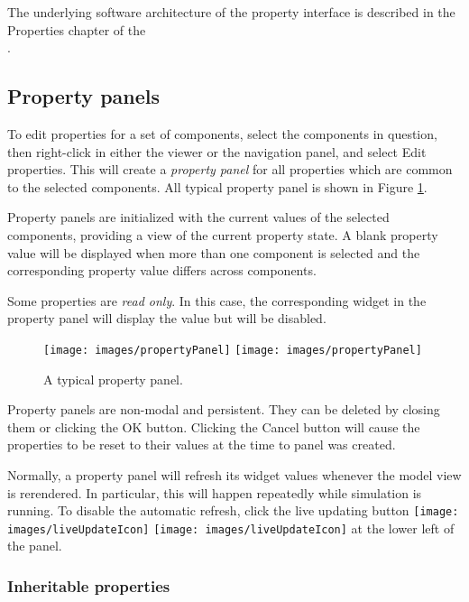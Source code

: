 \documentclass{article}
\begin{document}
The underlying software architecture of the property interface is 
described in the Properties chapter of the\\
.

\subsection{Property panels}
\label{propertyPanelsSec}

To edit properties for a set of components, select the components in
question, then right-click in either the viewer or the navigation
panel, and select {\sf Edit properties}. This will create a {\it property
panel} for all properties which are common to the selected components.
All typical property panel is shown in Figure \ref{propertyPanelFig}.

Property panels are initialized with the current values of the selected
components, providing a view of the current property state. A blank
property value will be displayed when more than one component is selected and 
the corresponding property value differs across components.

Some properties are {\it read only}. In this case, the corresponding
widget in the property panel will display the value but will be
disabled.

\begin{figure}[h]
\begin{center}
\iflatexml
\texttt{[image: images/propertyPanel]}
\else
\texttt{[image: images/propertyPanel]}
\fi
\end{center}
\caption{A typical property panel.}%
\label{propertyPanelFig}
\end{figure}

Property panels are non-modal and persistent. 
They can be deleted by
closing them or clicking the {\sf OK} button. Clicking the {\sf Cancel} button
will cause the properties to be reset to their values at the time to
panel was created.

Normally, a property panel will refresh its widget values whenever the
model view is rerendered. In particular, this will happen repeatedly
while simulation is running. To disable the automatic refresh, click
the {\sf live updating} button 
\iflatexml
\texttt{[image: images/liveUpdateIcon]}
\else
\texttt{[image: images/liveUpdateIcon]}
\fi
at the lower
left of the panel.

\subsubsection{Inheritable properties}
\end{document}
